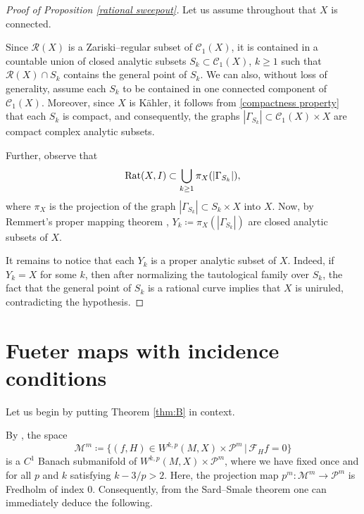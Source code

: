 \documentclass[11pt,a4paper]{article}
\theoremstyle{definition}
\newcommand{\Rat}{\textnormal{Rat}}
\newcommand{\cC}{\mathcal{C}}
\newcommand{\cF}{\mathcal{F}}
\newcommand{\cP}{\mathcal{P}}
\newcommand{\cR}{\mathcal{R}}
\newcommand{\cM}{\mathcal{M}}
\begin{document}
\begin{proof}[Proof of Proposition \ref{rational sweepout}]
  Let us assume throughout that $X$ is connected.

  Since $\cR(X)$ is a Zariski--regular subset of $\cC_1(X)$, it is contained in a countable union of closed analytic subsets $S_k \subset \cC_1(X)$, $k \geq 1$ such that $\cR(X) \cap S_k$ contains the general point of $S_k$. We can also, without loss of generality, assume each $S_k$ to be contained in one connected component of $\cC_1(X)$. Moreover, since $X$ is K\"ahler, it follows from \ref{compactness property} that each $S_k$ is compact, and consequently, the graphs $|\Gamma_{S_k}| \subset \cC_1(X) \times X$ are compact complex analytic subsets. 

  Further, observe that
  \begin{equation*}
    \Rat(X, I) \subset \bigcup_{k\geq 1} \pi_X (|\Gamma_{S_k}|),
  \end{equation*} 
  where $\pi_X$ is the projection of the graph $|\Gamma_{S_k}| \subset S_k \times X$ into $X$. Now, by Remmert's proper mapping theorem \cite[Chapter I, Theorem 8.8]{DemaillyCADG}, $Y_k \coloneq \pi_X (|\Gamma_{S_k}|)$ are closed analytic subsets of $X$. 

  It remains to notice that each $Y_k$ is a proper analytic subset of $X$. Indeed, if $Y_k = X$ for some $k$, then after normalizing the tautological family over $S_k$, the fact that the general point of $S_k$ is a rational curve implies that $X$ is uniruled, contradicting the hypothesis.
\end{proof}

\section{Fueter maps with incidence conditions}\label{Fueter maps with incidence conditions}

Let us begin by putting Theorem \ref{thm:B} in context.

By \cite[Proof of Theorem 4.1]{HNS09}, the space
\begin{equation*}
  \cM^m \coloneq \{ (f, H) \in W^{k, p}(M, X) \times \cP^m  \,| \, \cF_H f = 0 \} 
\end{equation*}
is a $C^1$ Banach submanifold of $W^{k, p}(M, X) \times \cP^m$, where we have fixed once and for all $p$ and $k$ satisfying $k-3/p>2$. Here, the projection map $p^m : \cM^m \to \cP^m$ is Fredholm of index $0$. Consequently, from the Sard--Smale theorem \cite{Sm65} one can immediately deduce the following.
\end{document}
